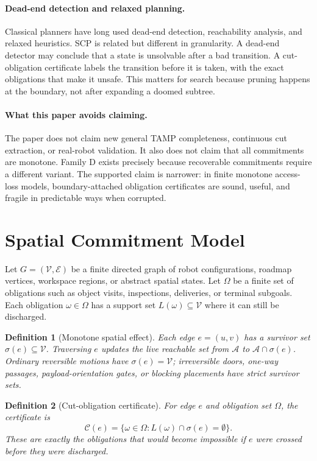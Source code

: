 \documentclass{article}
\newtheorem{definition}{Definition}
\newcommand{\vertices}{\mathcal{V}}
\newcommand{\edges}{\mathcal{E}}
\newcommand{\obligations}{\Omega}
\newcommand{\live}{\mathcal{A}}
\newcommand{\cert}{\mathcal{C}}
\newcommand{\survive}{\sigma}
\begin{document}
\paragraph{Dead-end detection and relaxed planning.}
Classical planners have long used dead-end detection, reachability analysis, and relaxed heuristics. SCP is related but different in granularity. A dead-end detector may conclude that a state is unsolvable after a bad transition. A cut-obligation certificate labels the transition before it is taken, with the exact obligations that make it unsafe. This matters for search because pruning happens at the boundary, not after expanding a doomed subtree.

\paragraph{What this paper avoids claiming.}
The paper does not claim new general TAMP completeness, continuous cut extraction, or real-robot validation. It also does not claim that all commitments are monotone. Family D exists precisely because recoverable commitments require a different variant. The supported claim is narrower: in finite monotone access-loss models, boundary-attached obligation certificates are sound, useful, and fragile in predictable ways when corrupted.

\section{Spatial Commitment Model}

Let $G=(\vertices,\edges)$ be a finite directed graph of robot configurations, roadmap vertices, workspace regions, or abstract spatial states. Let $\obligations$ be a finite set of obligations such as object visits, inspections, deliveries, or terminal subgoals. Each obligation $\omega\in\obligations$ has a support set $L(\omega)\subseteq\vertices$ where it can still be discharged.

\begin{definition}[Monotone spatial effect]
Each edge $e=(u,v)$ has a survivor set $\survive(e)\subseteq\vertices$. Traversing $e$ updates the live reachable set from $\live$ to $\live\cap\survive(e)$. Ordinary reversible motions have $\survive(e)=\vertices$; irreversible doors, one-way passages, payload-orientation gates, or blocking placements have strict survivor sets.
\end{definition}

\begin{definition}[Cut-obligation certificate]
For edge $e$ and obligation set $\obligations$, the certificate is
\[
  \cert(e)=\{\omega\in\obligations : L(\omega)\cap\survive(e)=\emptyset\}.
\]
These are exactly the obligations that would become impossible if $e$ were crossed before they were discharged.
\end{definition}
\end{document}
